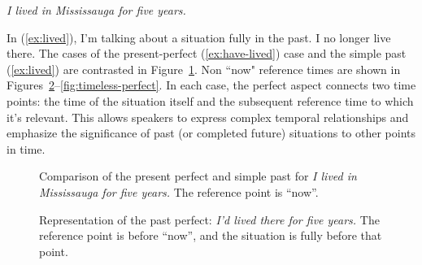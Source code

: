 \ea \textit{I lived in Mississauga for five years.}\label{ex:lived}
\z

In (\ref{ex:lived}), I'm talking about a situation fully in the past. I no longer live there. The cases of the present-perfect (\ref{ex:have-lived}) case and the simple past (\ref{ex:lived}) are contrasted in Figure~\ref{fig:past-vs-present-perfect}. Non ``now" reference times are shown in Figures~\ref{fig:past-perfect}--\ref{fig:timeless-perfect}. In each case, the perfect aspect connects two time points: the time of the situation itself and the subsequent reference time to which it's relevant. This allows speakers to express complex temporal relationships and emphasize the significance of past (or completed future) situations to other points in time.

\begin{figure}[ht]
    \centering
    \caption{Comparison of the present perfect and simple past for \textit{I lived in Mississauga for five years.} The reference point is ``now''.}
    \label{fig:past-vs-present-perfect}
\end{figure}

\begin{figure}[ht]
    \centering
    \caption{Representation of the past perfect: \textit{I'd lived there for five years.} The reference point is before ``now'', and the situation is fully before that point.}
    \label{fig:past-perfect}
\end{figure}

